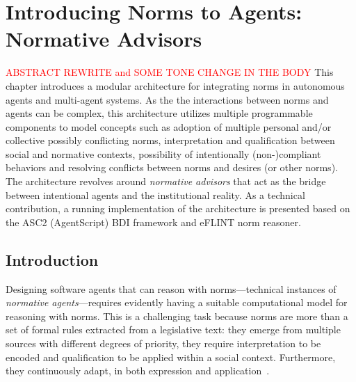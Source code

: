 \chapter{Introducing Norms to Agents: Normative Advisors}
\label{ch:normative_advisors}
\textcolor{red}{ABSTRACT REWRITE and SOME TONE CHANGE IN THE BODY} This chapter introduces a modular architecture for integrating norms in autonomous agents and multi-agent systems. As the the interactions between norms and agents can be complex, this architecture utilizes multiple programmable components to model concepts such as adoption of multiple personal and/or collective possibly conflicting norms, interpretation and qualification between social and normative contexts, possibility of intentionally (non-)compliant behaviors and resolving conflicts between norms and desires (or other norms). The architecture revolves around \emph{normative advisors} that act as the bridge between intentional agents and the institutional reality. As a technical contribution, a running implementation of the architecture is presented based on the ASC2 (AgentScript) BDI framework and eFLINT norm reasoner. 


\section{Introduction}
Designing software agents that can reason with norms---technical instances of \emph{normative agents}---requires evidently having a suitable computational model for reasoning with norms. This is a challenging task because norms are more than a set of formal rules extracted from a legislative text: they emerge from multiple sources with different degrees of priority, they require interpretation to be encoded and qualification to be applied within a social context. Furthermore, they continuously adapt, in both expression and application~\cite{Boella2014APractice}. 

